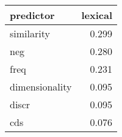 \begin{tabular}{lr}
\toprule
      predictor &  lexical \\
\midrule
     similarity &    0.299 \\
            neg &    0.280 \\
           freq &    0.231 \\
 dimensionality &    0.095 \\
          discr &    0.095 \\
            cds &    0.076 \\
\bottomrule
\end{tabular}
